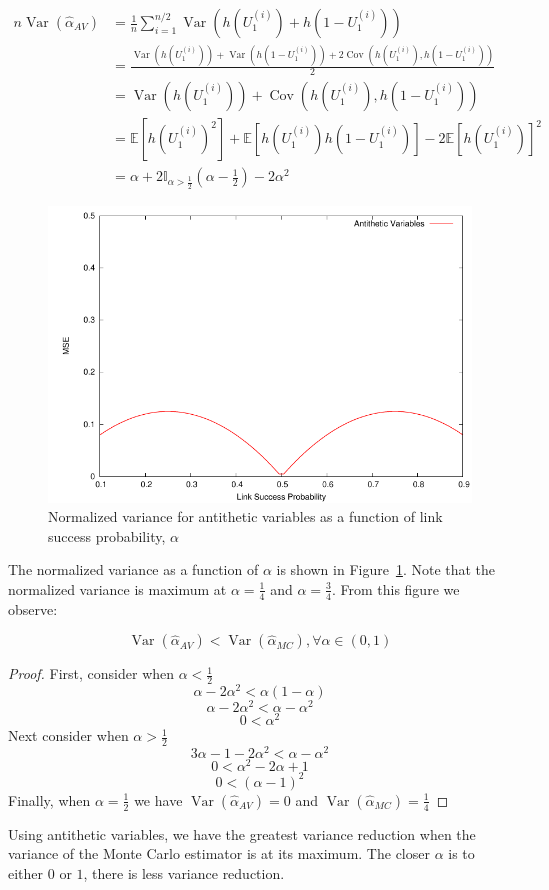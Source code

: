 \documentclass[11pt]{article}
\DeclareMathOperator{\var}{Var}
\DeclareMathOperator{\cov}{Cov}
\begin{document}
\begin{align*}
n\var\left(\hat{\alpha}_{AV}\right) &= \frac{1}{n}\sum_{i=1}^{n/2}\var\left(h(U_{1}^{(i)}) + h(1-U_{1}^{(i)})\right)\\
&=\frac{\var\left(h(U_{1}^{(i)})\right) + \var\left(h(1-U_{1}^{(i)})\right) + 2\cov\left(h(U_{1}^{(i)}),h(1-U_{1}^{(i)})\right)}{2}\\
&=\var\left(h(U_{1}^{(i)})\right) + \cov\left(h(U_{1}^{(i)}),h(1-U_{1}^{(i)})\right)\\
&=\mathbb{E}\left[h(U_{1}^{(i)})^2\right] + \mathbb{E}\left[h(U_{1}^{(i)})h(1-U_{1}^{(i)})\right] - 2\mathbb{E}\left[h(U_{1}^{(i)})\right]^{2}\\
&=\alpha+ 2\mathbb{I}_{\alpha > \frac{1}{2}}(\alpha-\frac{1}{2})-2\alpha^{2}
\end{align*}

\begin{figure}[ht!]
\centering
\includegraphics[width=0.75\columnwidth]{img/av}
\caption{Normalized variance for antithetic variables as a function of link success probability, $\alpha$}\label{fig:av}
\end{figure}

The normalized variance as a function of $\alpha$ is shown in Figure~\ref{fig:av}. Note that the normalized variance is maximum at $\alpha = \frac{1}{4}$ and $\alpha = \frac{3}{4}$. From this figure we observe:
\begin{proposition}\label{prop:av}
\[
\var\left(\hat{\alpha}_{AV}\right) < \var\left(\hat{\alpha}_{MC}\right), \forall \alpha \in (0,1)
\]
\end{proposition}

\begin{proof}
First, consider when $\alpha < \frac{1}{2}$
\[
\alpha - 2\alpha^2  <  \alpha(1-\alpha)
\]
\[
\alpha - 2\alpha^2  <  \alpha-\alpha^2
\]
\[
0  <  \alpha^2
\]
Next consider when $\alpha > \frac{1}{2}$
\[
3\alpha - 1 - 2\alpha^2 < \alpha - \alpha^{2}
\]
\[
0 < \alpha^2 - 2\alpha + 1
\]
\[
0 < (\alpha - 1)^2
\]
Finally, when $\alpha = \frac{1}{2}$ we have $\var\left(\hat{\alpha}_{AV}\right) = 0$ and $\var\left(\hat{\alpha}_{MC}\right) = \frac{1}{4}$
\end{proof}
Using antithetic variables, we have the greatest variance reduction when the variance of the Monte Carlo estimator is at its maximum. The closer $\alpha$ is to either $0$ or $1$, there is less variance reduction.
\end{document}
